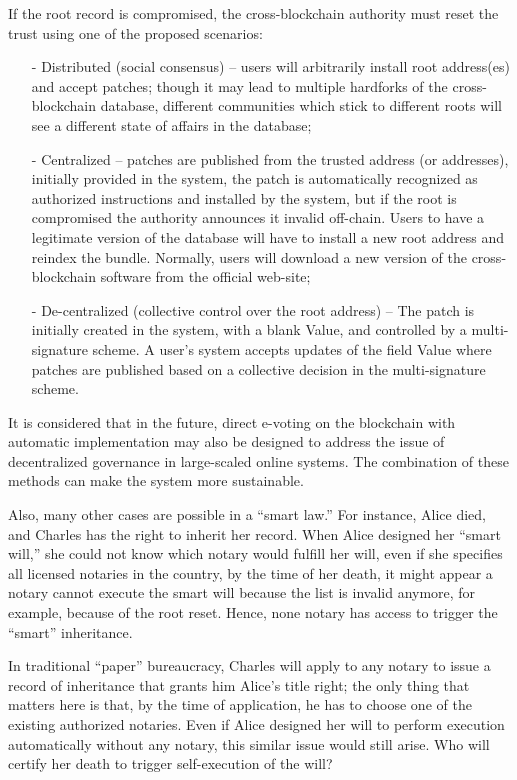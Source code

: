 \begin{multicols}{2}
If the root record is compromised, the cross-blockchain authority must reset the trust using one of the proposed scenarios:
\begin{itemize}
\item[-] Distributed (social consensus) – users will arbitrarily install root address(es) and accept patches; though it may lead to multiple hardforks of the cross-blockchain database, different communities which stick to different roots will see a different state of affairs in the database;
\item[-] Centralized – patches are published from the trusted address (or addresses), initially provided in the system, the patch is automatically recognized as authorized instructions and installed by the system, but if the root is compromised the authority announces it invalid off-chain. Users to have a legitimate version of the database will have to install a new root address and reindex the bundle. Normally, users will download a new version of the cross-blockchain software from the official web-site;
\item[-] De-centralized (collective control over the root address) – The patch is initially created in the system, with a blank Value, and controlled by a multi-signature scheme. A user’s system accepts updates of the field Value where patches are published based on a collective decision in the multi-signature scheme.
\end{itemize}

It is considered that in the future, direct e-voting on the blockchain with automatic implementation may also be designed to address the issue of decentralized governance in large-scaled online systems. The combination of these methods can make the system more sustainable.

Also, many other cases are possible in a “smart law.” For instance, Alice died, and Charles has the right to inherit her record. When Alice designed her “smart will,” she could not know which notary would fulfill her will, even if she specifies all licensed notaries in the country, by the time of her death, it might appear a notary cannot execute the smart will because the list is invalid anymore, for example, because of the root reset. Hence, none notary has access to trigger the “smart” inheritance.

In traditional “paper” bureaucracy, Charles will apply to any notary to issue a record of inheritance that grants him Alice’s title right; the only thing that matters here is that, by the time of application, he has to choose one of the existing authorized notaries. Even if Alice designed her will to perform execution automatically without any notary, this similar issue would still arise. Who will certify her death to trigger self-execution of the will?


\end{multicols}
